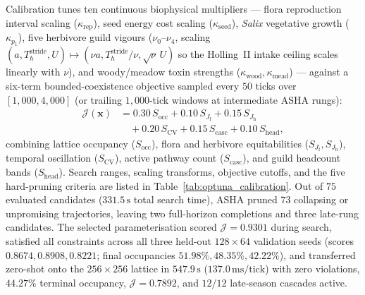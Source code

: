 Calibration tunes ten continuous biophysical multipliers --- flora reproduction interval scaling ($\kappa_{\mathrm{rep}}$), seed energy cost scaling ($\kappa_{\mathrm{seed}}$), \textit{Salix} vegetative growth ($\kappa_{p_1}$), five herbivore guild vigours ($\nu_0\text{--}\nu_4$, scaling $(a, T_h^{\mathrm{stride}}, U) \mapsto (\nu a, T_h^{\mathrm{stride}}/\nu, \sqrt{\nu}\,U)$ so the Holling~II intake ceiling scales linearly with $\nu$), and woody/meadow toxin strengths ($\kappa_{\mathrm{wood}}, \kappa_{\mathrm{mead}}$) --- against a six-term bounded-coexistence objective sampled every $50$ ticks over $[1{,}000, 4{,}000]$ (or trailing $1{,}000$-tick windows at intermediate ASHA rungs):
\begin{align}
  \mathcal{J}(\mathbf{x}) &= 0.30\,S_{\mathrm{occ}} + 0.10\,S_{J_{\mathrm{f}}} + 0.15\,S_{J_{\mathrm{h}}} \nonumber \\
  &\quad + 0.20\,S_{\mathrm{CV}} + 0.15\,S_{\mathrm{casc}} + 0.10\,S_{\mathrm{head}},
  \label{eq:optuna_objective}
\end{align}
combining lattice occupancy ($S_{\mathrm{occ}}$), flora and herbivore equitabilities ($S_{J_{\mathrm{f}}}, S_{J_{\mathrm{h}}}$), temporal oscillation ($S_{\mathrm{CV}}$), active pathway count ($S_{\mathrm{casc}}$), and guild headcount bands ($S_{\mathrm{head}}$). Search ranges, scaling transforms, objective cutoffs, and the five hard-pruning criteria are listed in Table~\ref{tab:optuna_calibration}. Out of $75$ evaluated candidates ($331.5\,\text{s}$ total search time), ASHA pruned $73$ collapsing or unpromising trajectories, leaving two full-horizon completions and three late-rung candidates. The selected parameterisation scored $\mathcal{J} = 0.9301$ during search, satisfied all constraints across all three held-out $128 \times 64$ validation seeds (scores $0.8674, 0.8908, 0.8221$; final occupancies $51.98\%, 48.35\%, 42.22\%$), and transferred zero-shot onto the $256 \times 256$ lattice in $547.9\,\text{s}$ ($137.0\,\text{ms/tick}$) with zero violations, $44.27\%$ terminal occupancy, $\mathcal{J} = 0.7892$, and $12/12$ late-season cascades active.

